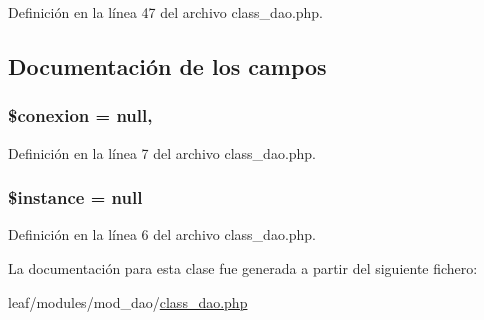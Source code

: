Definición en la línea 47 del archivo class\-\_\-dao.\-php.



\subsection{Documentación de los campos}
\hypertarget{classdao_a881924afaecbe8ee5c0d26174a1e8081}{
\subsubsection[{\$conexion}]{\setlength{\rightskip}{0pt plus 5cm}\$conexion = null\hspace{0.3cm}{\ttfamily [static]}, {\ttfamily [protected]}}}\label{classdao_a881924afaecbe8ee5c0d26174a1e8081}


Definición en la línea 7 del archivo class\-\_\-dao.\-php.

\hypertarget{classdao_ad9d7ce33ebb142b70e58b68052ca0ea8}{
\subsubsection[{\$instance}]{\setlength{\rightskip}{0pt plus 5cm}\$instance = null}}\label{classdao_ad9d7ce33ebb142b70e58b68052ca0ea8}


Definición en la línea 6 del archivo class\-\_\-dao.\-php.



La documentación para esta clase fue generada a partir del siguiente fichero\-:\begin{DoxyCompactItemize}
\item 
leaf/modules/mod\-\_\-dao/\hyperlink{class__dao_8php}{class\-\_\-dao.\-php}\end{DoxyCompactItemize}
